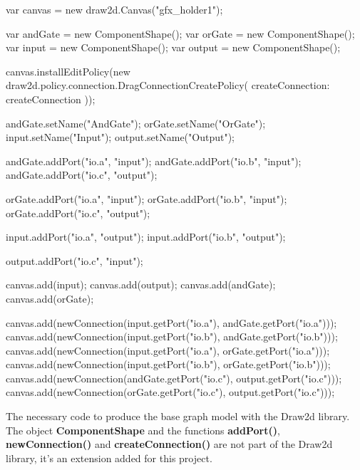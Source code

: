 \begin{listing}[H]
  \centering
  \begin{jscode}
    var canvas = new draw2d.Canvas("gfx_holder1");

    var andGate = new ComponentShape();
    var orGate = new ComponentShape();
    var input = new ComponentShape();
    var output = new ComponentShape();

    canvas.installEditPolicy(new draw2d.policy.connection.DragConnectionCreatePolicy({
      createConnection: createConnection
    }));

    andGate.setName("AndGate");
    orGate.setName("OrGate");
    input.setName("Input");
    output.setName("Output");

    andGate.addPort("io.a", "input");
    andGate.addPort("io.b", "input");
    andGate.addPort("io.c", "output");

    orGate.addPort("io.a", "input");
    orGate.addPort("io.b", "input");
    orGate.addPort("io.c", "output");

    input.addPort("io.a", "output");
    input.addPort("io.b", "output");

    output.addPort("io.c", "input");

    canvas.add(input);
    canvas.add(output);
    canvas.add(andGate);
    canvas.add(orGate);

    canvas.add(newConnection(input.getPort("io.a"), andGate.getPort("io.a")));
    canvas.add(newConnection(input.getPort("io.b"), andGate.getPort("io.b")));
    canvas.add(newConnection(input.getPort("io.a"), orGate.getPort("io.a")));
    canvas.add(newConnection(input.getPort("io.b"), orGate.getPort("io.b")));
    canvas.add(newConnection(andGate.getPort("io.c"), output.getPort("io.c")));
    canvas.add(newConnection(orGate.getPort("io.c"), output.getPort("io.c")));
  \end{jscode}

  \caption[Base graph modeling implementation using the Draw2D library]{The necessary code to produce the base graph model with the Draw2d library.
    The object \textbf{ComponentShape} and the functions \textbf{addPort()},
    \textbf{newConnection()} and \textbf{createConnection()} are not part of the
    Draw2d library, it's an extension added for this project.}
  \label{lst:draw2d-base-graph-model}
\end{listing}


